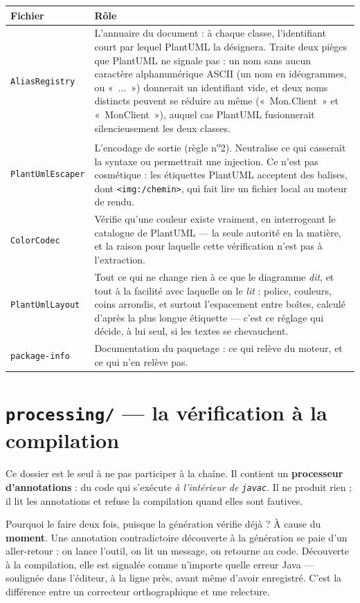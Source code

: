 \documentclass[12pt, a4paper]{article}
\begin{document}
\begin{longtable}{L{4.2cm} L{10cm}}
\toprule
\textbf{Fichier} & \textbf{Rôle} \\
\midrule
\endhead
\texttt{AliasRegistry} &
L'annuaire du document : à chaque classe, l'identifiant court par lequel PlantUML la désignera.
Traite deux pièges que PlantUML ne signale pas : un nom sans aucun caractère alphanumérique
ASCII (un nom en idéogrammes, ou «~...~») donnerait un identifiant vide, et deux noms distincts
peuvent se réduire au même
(«~Mon.Client~» et «~MonClient~»), auquel cas PlantUML fusionnerait silencieusement les deux
classes. \\
\addlinespace
\texttt{PlantUmlEscaper} &
L'encodage de sortie (règle n\textsuperscript{o}2). Neutralise ce qui casserait la syntaxe ou
permettrait une injection. Ce n'est pas cosmétique : les étiquettes PlantUML acceptent des
balises, dont \texttt{<img:/chemin>}, qui fait lire un fichier local au moteur de rendu. \\
\addlinespace
\texttt{ColorCodec} &
Vérifie qu'une couleur existe vraiment, en interrogeant le catalogue de PlantUML — la seule
autorité en la matière, et la raison pour laquelle cette vérification n'est pas à l'extraction. \\
\addlinespace
\texttt{PlantUmlLayout} &
Tout ce qui ne change rien à ce que le diagramme \emph{dit}, et tout à la facilité avec
laquelle on le \emph{lit} : police, couleurs, coins arrondis, et surtout l'espacement entre
boîtes, calculé d'après la plus longue étiquette — c'est ce réglage qui décide, à lui seul, si
les textes se chevauchent. \\
\addlinespace
\texttt{package-info} &
Documentation du paquetage : ce qui relève du moteur, et ce qui n'en relève pas. \\
\bottomrule
\end{longtable}

\section{\texttt{processing/} — la vérification à la compilation}

Ce dossier est le seul à ne pas participer à la chaîne. Il contient un \textbf{processeur
d'annotations} : du code qui s'exécute \emph{à l'intérieur de \texttt{javac}}. Il ne produit
rien ; il lit les annotations et refuse la compilation quand elles sont fautives.

Pourquoi le faire deux fois, puisque la génération vérifie déjà ? À cause du \textbf{moment}.
Une annotation contradictoire découverte à la génération se paie d'un aller-retour : on lance
l'outil, on lit un message, on retourne au code. Découverte à la compilation, elle est signalée
comme n'importe quelle erreur Java — soulignée dans l'éditeur, à la ligne près, avant même
d'avoir enregistré. C'est la différence entre un correcteur orthographique et une relecture.
\end{document}
